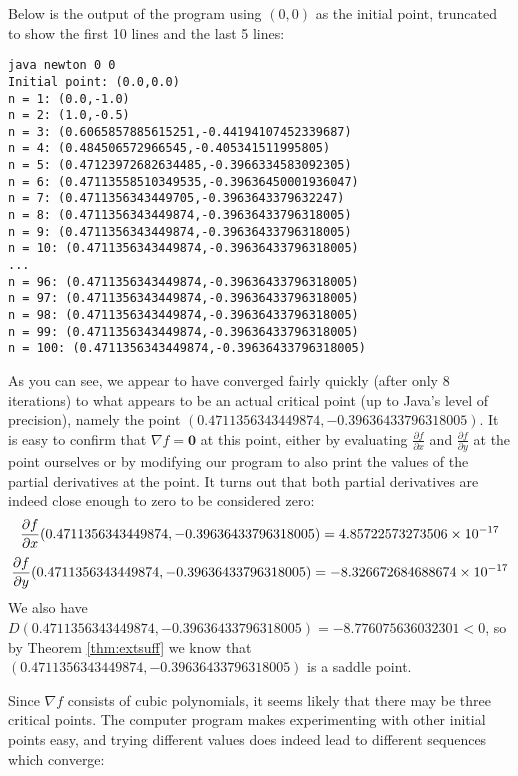 \begin{exmp}
Below is the output of the program using $(0,0)$ as the initial point, truncated to show the first 10 lines and
the last 5 lines:

\begin{verbatim}
java newton 0 0
Initial point: (0.0,0.0)
n = 1: (0.0,-1.0)
n = 2: (1.0,-0.5)
n = 3: (0.6065857885615251,-0.44194107452339687)
n = 4: (0.484506572966545,-0.405341511995805)
n = 5: (0.47123972682634485,-0.3966334583092305)
n = 6: (0.47113558510349535,-0.39636450001936047)
n = 7: (0.4711356343449705,-0.3963643379632247)
n = 8: (0.4711356343449874,-0.39636433796318005)
n = 9: (0.4711356343449874,-0.39636433796318005)
n = 10: (0.4711356343449874,-0.39636433796318005)
...
n = 96: (0.4711356343449874,-0.39636433796318005)
n = 97: (0.4711356343449874,-0.39636433796318005)
n = 98: (0.4711356343449874,-0.39636433796318005)
n = 99: (0.4711356343449874,-0.39636433796318005)
n = 100: (0.4711356343449874,-0.39636433796318005)
\end{verbatim}

As you can see, we appear to have converged fairly quickly (after only 8 iterations) to what appears to be an actual
critical point (up to Java's level of precision), namely the point
$(0.4711356343449874,-0.39636433796318005)$. It is easy to confirm that $\nabla f = \mathbf{0}$ at this point,
either by evaluating $\frac{\partial f}{\partial x}$ and $\frac{\partial f}{\partial y}$ at the point ourselves or by
modifying our program to also print the values of the partial derivatives at the point. It turns out that
both partial derivatives are indeed close enough to zero to be considered zero:
\begin{gather*}
 \frac{\partial f}{\partial x}(0.4711356343449874,-0.39636433796318005) = 4.85722573273506 \times 10^{-17}\smallskip\\
 \frac{\partial f}{\partial y}(0.4711356343449874,-0.39636433796318005) = -8.326672684688674 \times 10^{-17}
\end{gather*}
We also have $D(0.4711356343449874,-0.39636433796318005) = -8.776075636032301 < 0$, so by
Theorem \ref{thm:extsuff} we know that $(0.4711356343449874,-0.39636433796318005)$ is a saddle point.

Since $\nabla f$ consists of cubic polynomials, it seems likely that there may be three critical points.
The computer program makes experimenting with other initial points easy, and trying different values does indeed lead
to different sequences which converge:


\end{exmp}
